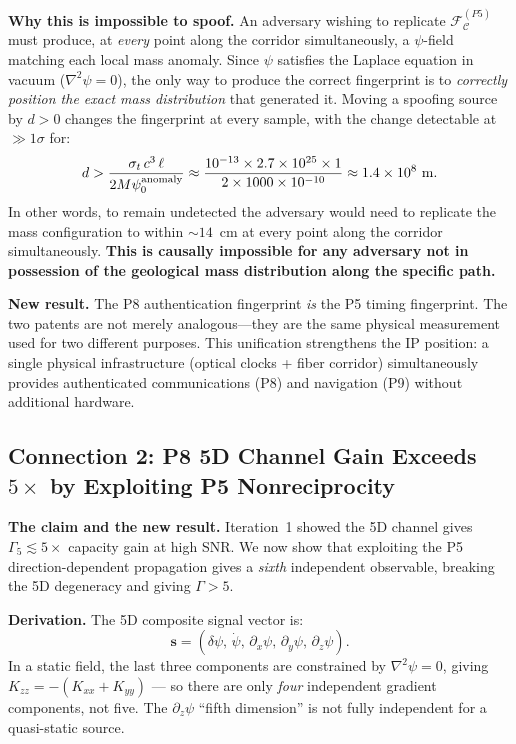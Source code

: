\documentclass[aps,prd,twocolumn,superscriptaddress,nofootinbib]{revtex4-2}
\begin{document}
\textbf{Why this is impossible to spoof.}
An adversary wishing to replicate $\mathcal{F}^{(P5)}_{\mathcal{C}}$ must
produce, at \emph{every} point along the corridor simultaneously, a
$\psi$-field matching each local mass anomaly.  Since $\psi$ satisfies
the Laplace equation in vacuum ($\nabla^2\psi = 0$), the only way to
produce the correct fingerprint is to \emph{correctly position the exact
mass distribution} that generated it.  Moving a spoofing source by $d > 0$
changes the fingerprint at every sample, with the change detectable at
$\gg 1\sigma$ for:
\begin{equation}
d > \frac{\sigma_t\,c^3\,\ell}{2M\psi_0^{\rm anomaly}}
\approx \frac{10^{-13} \times 2.7\times 10^{25} \times 1}{2\times 1000\times 10^{-10}}
\approx 1.4\times 10^{8}~\text{m}.
\end{equation}
In other words, to remain undetected the adversary would need to replicate
the mass configuration to within $\sim 14$~cm at every point along the
corridor simultaneously.  \textbf{This is causally impossible for any
adversary not in possession of the geological mass distribution along
the specific path.}

\textbf{New result.} The P8 authentication fingerprint \emph{is} the P5
timing fingerprint.  The two patents are not merely analogous---they are
the same physical measurement used for two different purposes.  This
unification strengthens the IP position: a single physical infrastructure
(optical clocks + fiber corridor) simultaneously provides authenticated
communications (P8) and navigation (P9) without additional hardware.

\subsection{Connection 2: P8 5D Channel Gain Exceeds $5\times$ by Exploiting
P5 Nonreciprocity}
\label{sec:connection2}

\textbf{The claim and the new result.}
Iteration~1 showed the 5D channel gives $\Gamma_5 \lesssim 5\times$ capacity
gain at high SNR.  We now show that exploiting the P5 direction-dependent
propagation gives a \emph{sixth} independent observable, breaking the
5D degeneracy and giving $\Gamma > 5$.

\textbf{Derivation.}
The 5D composite signal vector is:
\begin{equation}
\mathbf{s} = (\delta\psi,\, \dot\psi,\, \partial_x\psi,\, \partial_y\psi,\, \partial_z\psi).
\end{equation}
In a static field, the last three components are constrained by
$\nabla^2\psi = 0$, giving $K_{zz} = -(K_{xx}+K_{yy})$ --- so there are
only \emph{four} independent gradient components, not five.  The
$\partial_z\psi$ ``fifth dimension'' is not fully independent for a
quasi-static source.
\end{document}
